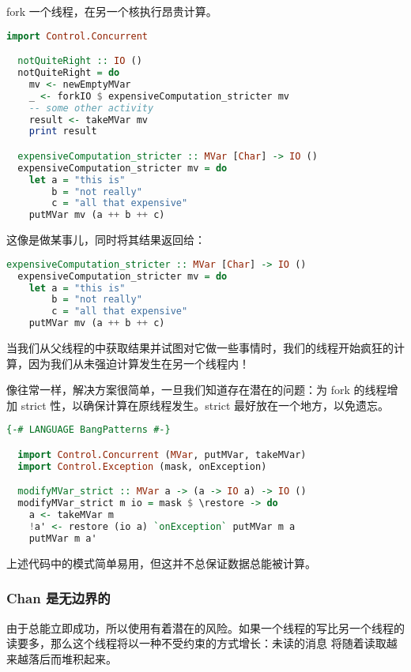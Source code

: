 \documentclass[./main.tex]{subfiles}
\begin{document}
fork 一个线程，在另一个核执行昂贵计算。

\begin{lstlisting}[language=Haskell]
  import Control.Concurrent

  notQuiteRight :: IO ()
  notQuiteRight = do
    mv <- newEmptyMVar
    _ <- forkIO $ expensiveComputation_stricter mv
    -- some other activity
    result <- takeMVar mv
    print result

  expensiveComputation_stricter :: MVar [Char] -> IO ()
  expensiveComputation_stricter mv = do
    let a = "this is"
        b = "not really"
        c = "all that expensive"
    putMVar mv (a ++ b ++ c)
\end{lstlisting}

这像是做某事儿，同时将其结果返回给：

\begin{lstlisting}[language=Haskell]
  expensiveComputation_stricter :: MVar [Char] -> IO ()
  expensiveComputation_stricter mv = do
    let a = "this is"
        b = "not really"
        c = "all that expensive"
    putMVar mv (a ++ b ++ c)
\end{lstlisting}

当我们从父线程的中获取结果并试图对它做一些事情时，我们的线程开始疯狂的计算，因为我们从未强迫计算发生在另一个线程内！

像往常一样，解决方案很简单，一旦我们知道存在潜在的问题：为 fork 的线程增加 strict 性，以确保计算在原线程发生。strict 最好放在一个地方，以免遗忘。

\begin{lstlisting}[language=Haskell]
  {-# LANGUAGE BangPatterns #-}

  import Control.Concurrent (MVar, putMVar, takeMVar)
  import Control.Exception (mask, onException)

  modifyMVar_strict :: MVar a -> (a -> IO a) -> IO ()
  modifyMVar_strict m io = mask $ \restore -> do
    a <- takeMVar m
    !a' <- restore (io a) `onException` putMVar m a
    putMVar m a'
\end{lstlisting}

上述代码中的\acode{!}模式简单易用，但这并不总保证数据总能被计算。

\subsubsection*{Chan 是无边界的}

由于总能立即成功，所以使用有着潜在的风险。如果一个线程的写比另一个线程的读要多，那么这个线程将以一种不受约束的方式增长：未读的消息
将随着读取越来越落后而堆积起来。
\end{document}
